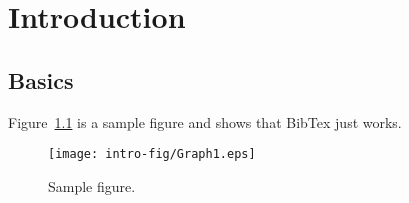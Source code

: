 \chapter{Introduction}

\section{Basics}

Figure~\ref{fig:intro} is a sample figure and \citet{1998SSRv...84..327C} shows that BibTex just works. 

\begin{figure}
\centering
\texttt{[image: intro-fig/Graph1.eps]}
\caption{Sample figure.}
\label{fig:intro}
\end{figure}




